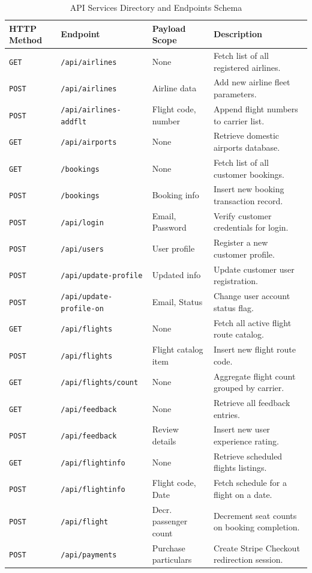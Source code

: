 \documentclass[12pt,a4paper]{article}
\begin{document}
\begin{table}[h!]
\centering
\small
\begin{tabular}{lllp{6cm}}
\toprule
\textbf{HTTP Method} & \textbf{Endpoint} & \textbf{Payload Scope} & \textbf{Description} \\
\midrule
\texttt{GET} & \texttt{/api/airlines} & None & Fetch list of all registered airlines. \\
\texttt{POST} & \texttt{/api/airlines} & Airline data & Add new airline fleet parameters. \\
\texttt{POST} & \texttt{/api/airlines-addflt} & Flight code, number & Append flight numbers to carrier list. \\
\texttt{GET} & \texttt{/api/airports} & None & Retrieve domestic airports database. \\
\texttt{GET} & \texttt{/bookings} & None & Fetch list of all customer bookings. \\
\texttt{POST} & \texttt{/bookings} & Booking info & Insert new booking transaction record. \\
\texttt{POST} & \texttt{/api/login} & Email, Password & Verify customer credentials for login. \\
\texttt{POST} & \texttt{/api/users} & User profile & Register a new customer profile. \\
\texttt{POST} & \texttt{/api/update-profile} & Updated info & Update customer user registration. \\
\texttt{POST} & \texttt{/api/update-profile-on} & Email, Status & Change user account status flag. \\
\texttt{GET} & \texttt{/api/flights} & None & Fetch all active flight route catalog. \\
\texttt{POST} & \texttt{/api/flights} & Flight catalog item & Insert new flight route code. \\
\texttt{GET} & \texttt{/api/flights/count} & None & Aggregate flight count grouped by carrier. \\
\texttt{GET} & \texttt{/api/feedback} & None & Retrieve all feedback entries. \\
\texttt{POST} & \texttt{/api/feedback} & Review details & Insert new user experience rating. \\
\texttt{GET} & \texttt{/api/flightinfo} & None & Retrieve scheduled flights listings. \\
\texttt{POST} & \texttt{/api/flightinfo} & Flight code, Date & Fetch schedule for a flight on a date. \\
\texttt{POST} & \texttt{/api/flight} & Decr. passenger count & Decrement seat counts on booking completion. \\
\texttt{POST} & \texttt{/api/payments} & Purchase particulars & Create Stripe Checkout redirection session. \\
\bottomrule
\end{tabular}
\caption{API Services Directory and Endpoints Schema}
\label{tab:apis}
\end{table}
\end{document}
